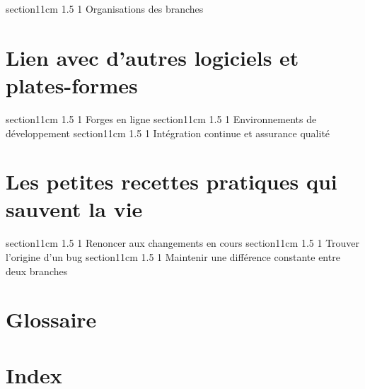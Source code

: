 \documentclass[a4paper,twoside,french]{book}
\makeatletter
\renewcommand\section{\@startsection
  {section}{1}{1cm}%
  {1.5\baselineskip}%
  {1\baselineskip}%
  {\normalfont\Large\bfseries}}%
\makeatother
\begin{document}
\section{Organisations des branches} %

\chapter{Lien avec d'autres logiciels et plates-formes} %
\section{Forges en ligne} %
\section{Environnements de développement} %
\section{Intégration continue et assurance qualité} %

\chapter{Les petites recettes pratiques qui sauvent la vie} %
\section{Renoncer aux changements en cours} %
\section{Trouver l'origine d'un bug} %
\section{Maintenir une différence constante entre deux branches} %

\chapter{Glossaire} %
\chapter{Index} %

\nocite{*}


\end{document}
